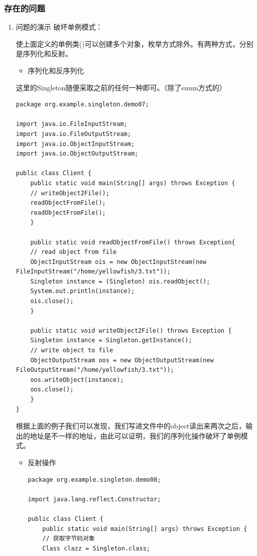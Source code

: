 \documentclass[11pt]{article}
\begin{document}
\subsubsection{存在的问题}
\label{sec:org4766ea6}
\begin{enumerate}
\item 问题的演示
\label{sec:orge77965b}
破坏单例模式：

使上面定义的单例类()可以创建多个对象，枚举方式除外。有两种方式，分别是序列化和反射。

\begin{itemize}
\item 序列化和反序列化
\end{itemize}

这里的Singleton随便采取之前的任何一种即可。（除了enum方式的）
\begin{verbatim}
package org.example.singleton.demo07;

import java.io.FileInputStream;
import java.io.FileOutputStream;
import java.io.ObjectInputStream;
import java.io.ObjectOutputStream;

public class Client {
    public static void main(String[] args) throws Exception {
	// writeObject2File();
	readObjectFromFile();
	readObjectFromFile();
    }

    public static void readObjectFromFile() throws Exception{
	// read object from file
	ObjectInputStream ois = new ObjectInputStream(new FileInputStream("/home/yellowfish/3.txt"));
	Singleton instance = (Singleton) ois.readObject();
	System.out.println(instance);
	ois.close();
    }

    public static void writeObject2File() throws Exception {
	Singleton instance = Singleton.getInstance();
	// write object to file
	ObjectOutputStream oos = new ObjectOutputStream(new FileOutputStream("/home/yellowfish/3.txt"));
	oos.writeObject(instance);
	oos.close();
    }
}
\end{verbatim}

根据上面的例子我们可以发现，我们写进文件中的object读出来两次之后，输出的地址是不一样的地址，由此可以证明，我们的序列化操作破坏了单例模式。

\begin{itemize}
\item 反射操作
\begin{verbatim}
package org.example.singleton.demo08;

import java.lang.reflect.Constructor;

public class Client {
    public static void main(String[] args) throws Exception {
	// 获取字节码对象
	Class clazz = Singleton.class;


\end{verbatim}
\end{itemize}
\end{enumerate}
\end{document}
